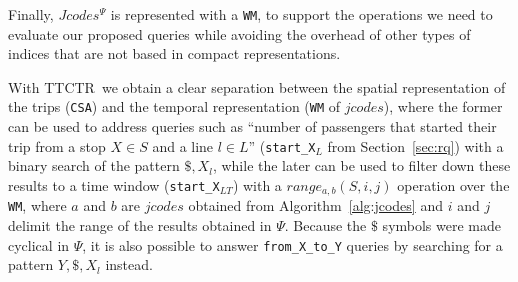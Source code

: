 \documentclass[runningheads]{llncs}
\newcommand{\ttctr}{TTCTR}
\begin{document}



Finally, $Jcodes^{\Psi}$ is represented with a \texttt{WM}, to support the operations we need to evaluate our proposed queries while avoiding the overhead of other types of indices that are not based in compact representations.

With \ttctr~we obtain a clear separation between the spatial representation of the trips (\texttt{CSA}) and the temporal representation (\texttt{WM} of $jcodes$), where the former can be used to address queries such as ``number of passengers that started their trip from a stop $X\in S$ and a line $l\in L$'' (\texttt{start\_X$_{L}$} from Section~\ref{sec:rq}) with a binary search of the pattern $\$,X_l$, while the later can be used to filter down these results to a time window (\texttt{start\_X$_{LT}$}) with a $range_{a,b}(S,i,j)$ operation over the \texttt{WM}, where $a$ and $b$ are $jcodes$ obtained from Algorithm~\ref{alg:jcodes} and $i$ and $j$ delimit the range of the results obtained in $\Psi$. Because the $\$$ symbols were made cyclical in $\Psi$, it is also possible to answer \texttt{from\_X\_to\_Y} queries by searching for a pattern $Y,\$,X_l$ instead.
\end{document}
